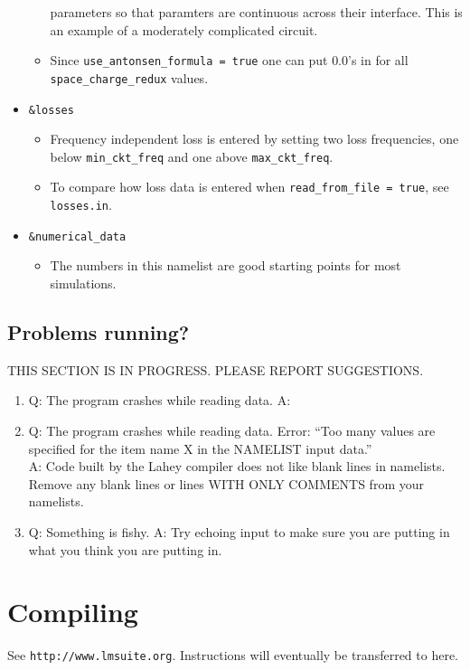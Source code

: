 \documentclass{article}
\begin{document}
\begin{itemize}
\begin{itemize}
    parameters so that paramters are continuous across their
    interface. This is an example of a moderately complicated
    circuit.
  \item Since {\tt use\_antonsen\_formula = true} one can put $0.0$'s in
    for all {\tt space\_charge\_redux} values.
  \end{itemize}
\item {\tt \&losses}
  \begin{itemize}
  \item Frequency independent loss is entered by setting two loss frequencies,
    one below {\tt min\_ckt\_freq} and one above {\tt max\_ckt\_freq}.
  \item To compare how loss data is entered when {\tt read\_from\_file =
      true}, see {\tt losses.in}.
  \end{itemize}
\item {\tt \&numerical\_data}
  \begin{itemize}
  \item The numbers in this namelist are good starting points for most
    simulations.
  \end{itemize}
\end{itemize}

\subsection{Problems running?}
THIS SECTION IS IN PROGRESS. PLEASE REPORT SUGGESTIONS.
\begin{enumerate}
\item Q: The program crashes while reading data. A:
\item Q: The program crashes while reading data. Error: ``Too many values
  are specified for the item name X in the NAMELIST input data.''\\
  A: Code built by the Lahey compiler does not like blank lines in namelists.
  Remove any blank lines or lines WITH ONLY COMMENTS from your namelists.
\item Q: Something is fishy. A: Try echoing input to make sure you are putting
  in what you think you are putting in.
\end{enumerate}





\section{Compiling}
See {\tt http://www.lmsuite.org}. Instructions
will eventually be transferred to here.
\end{document}
